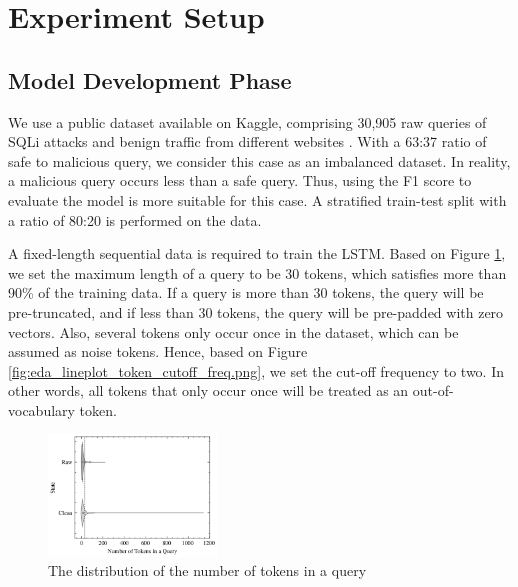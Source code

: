 \section{Experiment Setup}
\label{sec:experiment-setup}


\subsection{Model Development Phase}
\label{subsec:model-development-phase}
\par We use a public dataset available on Kaggle, comprising 30,905 raw queries of SQLi attacks and benign traffic from different websites \cite{SQLiDataset}. With a 63:37 ratio of safe to malicious query, we consider this case as an imbalanced dataset. In reality, a malicious query occurs less than a safe query. Thus, using the F1 score to evaluate the model is more suitable for this case. A stratified train-test split with a ratio of 80:20 is performed on the data.
\par A fixed-length sequential data is required to train the LSTM. Based on Figure \ref{fig:eda_violinplot_n_token_query}, we set the maximum length of a query to be 30 tokens, which satisfies more than 90\% of the training data. If a query is more than 30 tokens, the query will be pre-truncated, and if less than 30 tokens, the query will be pre-padded with zero vectors. Also, several tokens only occur once in the dataset, which can be assumed as noise tokens. Hence, based on Figure \ref{fig:eda_lineplot_token_cutoff_freq.png}, we set the cut-off frequency to two. In other words, all tokens that only occur once will be treated as an out-of-vocabulary token.

\begin{figure} [ht]
  \centering
  \includegraphics[width=0.4\textwidth]{image/eda_violinplot_n_token_query.png}

  \caption{The distribution of the number of tokens in a query}
  \label{fig:eda_violinplot_n_token_query}
\end{figure}

